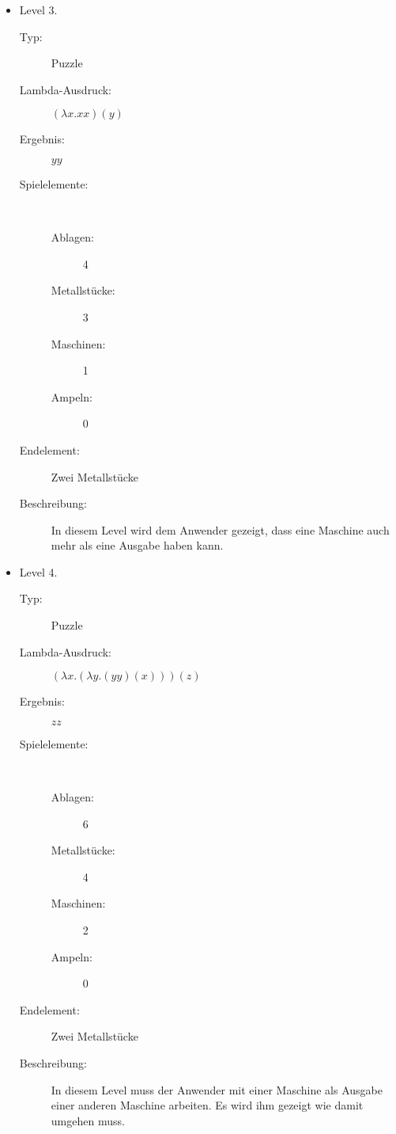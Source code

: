 \begin{itemize}
	\item{Level 3.}
	\begin{description}
		\item[Typ:] Puzzle
		\item[Lambda-Ausdruck:] $(\lambda x.x x)(y)$
		\item[Ergebnis:]$yy$
		\item[Spielelemente:]\ \linebreak[1]
		\begin{description}
			\item[Ablagen: ]4
			\item[Metallstücke: ]3
			\item[Maschinen: ]1
			\item[Ampeln: ]0
		\end{description}	
		\item[Endelement:] Zwei Metallstücke
		\item[Beschreibung:] In diesem Level wird dem Anwender gezeigt, dass eine Maschine auch mehr als eine Ausgabe haben kann.
	\end{description}
	
	\item{Level 4.}
	\begin{description}
		\item[Typ:] Puzzle
		\item[Lambda-Ausdruck:] $(\lambda x.(\lambda y.(yy)(x)))(z)$
		\item[Ergebnis:]$zz$
		\item[Spielelemente:]\ \linebreak[1]
		\begin{description}
			\item[Ablagen: ]6
			\item[Metallstücke: ]4
			\item[Maschinen: ]2
			\item[Ampeln: ]0
		\end{description}	
		\item[Endelement:] Zwei Metallstücke
		\item[Beschreibung:] In diesem Level muss der Anwender mit einer Maschine als Ausgabe einer anderen Maschine arbeiten. Es wird ihm gezeigt wie damit umgehen muss.
	\end{description}
	

\end{itemize}
